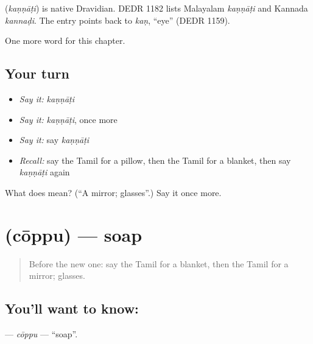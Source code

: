 \begin{cousinweb}
\textbf{} (\emph{kaṇṇāṭi}) is native Dravidian. DEDR 1182 lists Malayalam \emph{kaṇṇāṭi} and Kannada \emph{kannaḍi}. The entry points back to \emph{kaṇ}, \textquotedblleft{}eye\textquotedblright{} (DEDR 1159).
\end{cousinweb}

\begin{grammarlens}[title={What you've built}]
One more word for this chapter.
\end{grammarlens}

\subsection*{Your turn}
\begin{itemize}
\raggedright
  \item \emph{Say it:} \emph{kaṇṇāṭi}
  \item \emph{Say it:} \emph{kaṇṇāṭi}, once more
  \item \emph{Say it:} say \emph{kaṇṇāṭi}
  \item \emph{Recall:} say the Tamil for a pillow, then the Tamil for a blanket, then say \emph{kaṇṇāṭi} again
\end{itemize}

\begin{tcolorbox}[breakable,colback=teal!4,colframe=teal!35!black,title={Before you move on}]
What does  mean? (\textquotedblleft{}A mirror; glasses\textquotedblright{}.) Say it once more.
\end{tcolorbox}
\section[\texorpdfstring{\ta{சோப்பு} (cōppu)}{சோப்பு (cōppu)}]{ (cōppu) — soap}

\label{lesson:TA-C120-coppu}



\begin{quote}
Before the new one: say the Tamil for a blanket, then the Tamil for a mirror; glasses.
\end{quote}

\subsection*{You'll want to know: }
\textbf{} — \emph{cōppu} — \textquotedblleft{}soap\textquotedblright{}.

